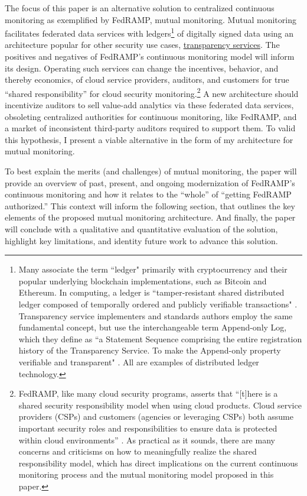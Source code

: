 \documentclass{jdf}
\begin{document}
The focus of this paper is an alternative solution to centralized continuous monitoring as exemplified by FedRAMP, mutual monitoring. Mutual monitoring facilitates federated data services with ledgers\footnote{Many associate the term ``ledger" primarily with cryptocurrency and their popular underlying blockchain implementations, such as Bitcoin and Ethereum. In computing, a ledger is ``tamper-resistant shared distributed ledger composed of temporally ordered and publicly verifiable transactions" \cite{bashir22}. Transparency service implementers and standards authors employ the same fundamental concept, but use the interchangeable term Append-only Log, which they define as ``a Statement Sequence comprising the entire registration history of the Transparency Service. To make the Append-only property verifiable and transparent" \cite{scitt25}. All are examples of distributed ledger technology.} of digitally signed data using an architecture popular for other security use cases, \href{https://transparency.dev}{transparency services}. The positives and negatives of FedRAMP's continuous monitoring model will inform its design. Operating such services can change the incentives, behavior, and thereby economics, of cloud service providers, auditors, and customers for true ``shared responsibility'' for cloud security monitoring.\footnote{FedRAMP, like many cloud security programs, asserts that ``[t]here is a shared security responsibility model when using cloud products. Cloud service providers (CSPs) and customers (agencies or leveraging CSPs) both assume important security roles and responsibilities to ensure data is protected within cloud environments'' \citeyear{fedramp_srm25}. As practical as it sounds, there are many concerns and criticisms on how to meaningfully realize the shared responsibility model, which has direct implications on the current continuous monitoring process and the mutual monitoring model proposed in this paper.} A new architecture should incentivize auditors to sell value-add analytics via these federated data services, obsoleting centralized authorities for continuous monitoring, like FedRAMP, and a market of inconsistent third-party auditors required to support them. To valid this hypothesis, I present a viable alternative in the form of my architecture for mutual monitoring.

To best explain the merits (and challenges) of mutual monitoring, the paper will provide an overview of past, present, and ongoing modernization of FedRAMP's continuous monitoring and how it relates to the ``whole'' of ``getting FedRAMP authorized.'' This context will inform the following section, that outlines the key elements of the proposed mutual monitoring architecture. And finally, the paper will conclude with a qualitative and quantitative evaluation of the solution, highlight key limitations, and identity future work to advance this solution.
\end{document}
